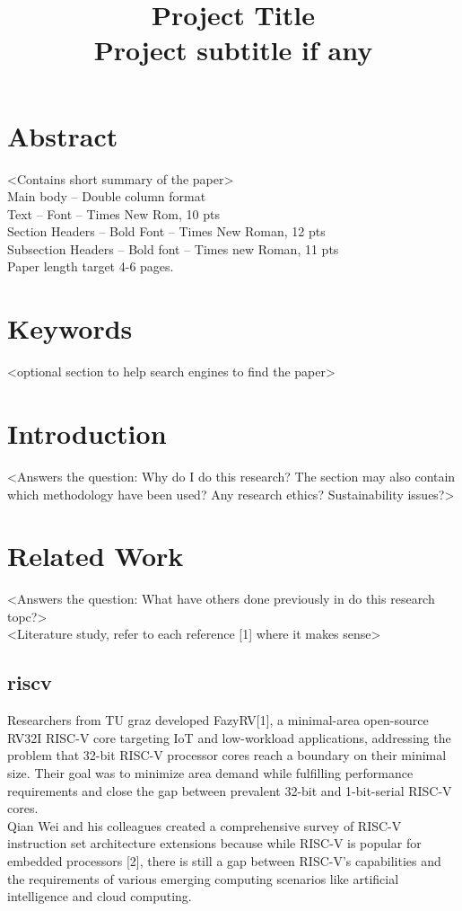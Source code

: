 \documentclass[10pt,twocolumn]{article}
\title{\textbf{Project Title}\\[0.5em]
\large Project subtitle if any}
\author{
Author #1 (auth #1 Email address), Author #2 (Email address), …
}
\date{}
\begin{document}
\maketitle

\section*{Abstract}
<Contains short summary of the paper>\\
Main body – Double column format\\
Text – Font – Times New Rom, 10 pts\\
Section Headers – Bold Font – Times New Roman, 12 pts\\
Subsection Headers – Bold font – Times new Roman, 11 pts\\
Paper length target 4-6 pages.

\section*{Keywords}
<optional section to help search engines to find the paper>

\section{Introduction}
<Answers the question: Why do I do this research? The section may also contain which methodology have been used? Any research ethics? Sustainability issues?>

\section{Related Work}
<Answers the question: What have others done previously in do this research topc?>\\
<Literature study, refer to each reference [1] where it makes sense>
\subsection{riscv}
Researchers from TU graz developed FazyRV[1], a minimal-area open-source RV32I RISC-V core targeting IoT and low-workload applications, addressing the problem that 32-bit RISC-V processor cores reach a boundary on their minimal size. Their goal was to minimize area demand while fulfilling performance requirements and close the gap between prevalent 32-bit and 1-bit-serial RISC-V cores.\\
Qian Wei and his colleagues created a comprehensive survey of RISC-V instruction set architecture extensions because while RISC-V is popular for embedded processors [2], there is still a gap between RISC-V's capabilities and the requirements of various emerging computing scenarios like artificial intelligence and cloud computing.
\end{document}
